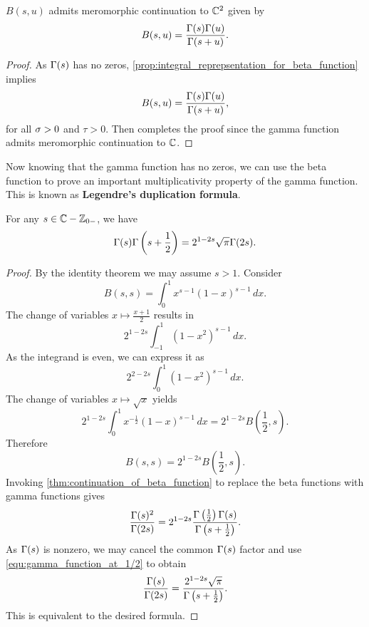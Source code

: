     \begin{theorem}\label{thm:continuation_of_beta_function}
      \(B(s,u)\) admits meromorphic continuation to \(\mathbb{C}^{2}\) given by
      \[
        B(s,u) = \frac{\Gamma(s)\Gamma(u)}{\Gamma(s+u)}.
      \]
    \end{theorem}
    \begin{proof}
      As \(\Gamma(s)\) has no zeros, \cref{prop:integral_reprepsentation_for_beta_function} implies
      \[
        B(s,u) = \frac{\Gamma(s)\Gamma(u)}{\Gamma(s+u)},
      \]
      for all \(\sigma > 0\) and \(\tau > 0\). Then completes the proof since the gamma function admits meromorphic continuation to \(\mathbb{C}\).
    \end{proof}

    Now knowing that the gamma function has no zeros, we can use the beta function to prove an important multiplicativity property of the gamma function. This is known as \textbf{Legendre's duplication formula}.

    \begin{theorem*}
      For any \(s \in \mathbb{C}-\mathbb{Z}_{0-}\), we have
      \[
        \Gamma(s)\Gamma\left(s+\frac{1}{2}\right) = 2^{1-2s}\sqrt{\pi}\Gamma(2s).
      \]
    \end{theorem*}
    \begin{proof}
      By the identity theorem we may assume \(s > 1\). Consider
      \[
        B(s,s) = \int_{0}^{1}x^{s-1}(1-x)^{s-1}\,dx.
      \]
      The change of variables \(x \mapsto \frac{x+1}{2}\) results in
      \[
        2^{1-2s}\int_{-1}^{1}(1-x^{2})^{s-1}\,dx.
      \]
      As the integrand is even, we can express it as
      \[
        2^{2-2s}\int_{0}^{1}(1-x^{2})^{s-1}\,dx.
      \]
      The change of variables \(x \mapsto \sqrt{x}\) yields
      \[
        2^{1-2s}\int_{0}^{1}x^{-\frac{1}{2}}(1-x)^{s-1}\,dx = 2^{1-2s}B\left(\frac{1}{2},s\right).
      \]
      Therefore
      \[
        B(s,s) = 2^{1-2s}B\left(\frac{1}{2},s\right).
      \]
      Invoking \cref{thm:continuation_of_beta_function} to replace the beta functions with gamma functions gives
      \[
        \frac{\Gamma(s)^{2}}{\Gamma(2s)} = 2^{1-2s}\frac{\Gamma\left(\frac{1}{2}\right)\Gamma(s)}{\Gamma\left(s+\frac{1}{2}\right)}.
      \]
      As \(\Gamma(s)\) is nonzero, we may cancel the common \(\Gamma(s)\) factor and use \cref{equ:gamma_function_at_1/2} to obtain
      \[
        \frac{\Gamma(s)}{\Gamma(2s)} = \frac{2^{1-2s}\sqrt{\pi}}{\Gamma\left(s+\frac{1}{2}\right)}.
      \]
      This is equivalent to the desired formula.
    \end{proof}

